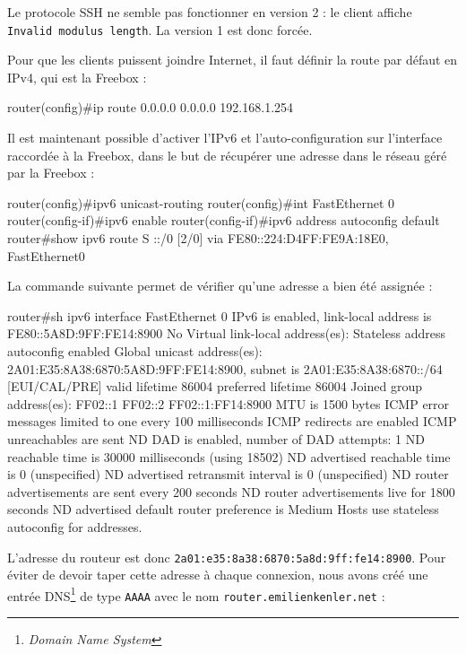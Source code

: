 \begin{warning}
Le protocole SSH ne semble pas fonctionner en version 2 : le client affiche \texttt{Invalid modulus length}.
La version 1 est donc forcée.
\end{warning}

Pour que les clients puissent joindre Internet, il faut définir la route par défaut en IPv4, qui est la Freebox :
\begin{code}
router(config)#ip route 0.0.0.0 0.0.0.0 192.168.1.254
\end{code}

Il est maintenant possible d'activer l’IPv6 et l’auto-configuration sur l’interface raccordée à la Freebox, dans le but de récupérer une adresse dans le réseau géré par la Freebox :

\begin{code}
router(config)#ipv6 unicast-routing 
router(config)#int FastEthernet 0
router(config-if)#ipv6 enable
router(config-if)#ipv6 address autoconfig default
router#show ipv6 route
S   ::/0 [2/0]
     via FE80::224:D4FF:FE9A:18E0, FastEthernet0
\end{code}

La commande suivante permet de vérifier qu'une adresse a bien été assignée :
\begin{code}
router#sh ipv6 interface FastEthernet 0
  IPv6 is enabled, link-local address is FE80::5A8D:9FF:FE14:8900 
  No Virtual link-local address(es):
  Stateless address autoconfig enabled
  Global unicast address(es):
    2A01:E35:8A38:6870:5A8D:9FF:FE14:8900, subnet is 2A01:E35:8A38:6870::/64 [EUI/CAL/PRE]
      valid lifetime 86004 preferred lifetime 86004
  Joined group address(es):
    FF02::1
    FF02::2
    FF02::1:FF14:8900
  MTU is 1500 bytes
  ICMP error messages limited to one every 100 milliseconds
  ICMP redirects are enabled
  ICMP unreachables are sent
  ND DAD is enabled, number of DAD attempts: 1
  ND reachable time is 30000 milliseconds (using 18502)
  ND advertised reachable time is 0 (unspecified)
  ND advertised retransmit interval is 0 (unspecified)
  ND router advertisements are sent every 200 seconds
  ND router advertisements live for 1800 seconds
  ND advertised default router preference is Medium
  Hosts use stateless autoconfig for addresses.
\end{code}

L'adresse du routeur est donc \texttt{2a01:e35:8a38:6870:5a8d:9ff:fe14:8900}.
Pour éviter de devoir taper cette adresse à chaque connexion, nous avons créé une entrée DNS\footnote{\emph{Domain Name System}} de type \texttt{AAAA} avec le nom \texttt{router.emilienkenler.net} :

